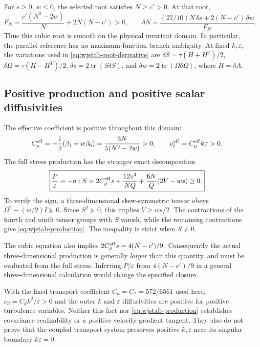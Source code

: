 \documentclass[11pt,a4paper]{article}
\numberwithin{equation}{section}
\begin{document}
For $s\geq0$, $w\leq0$, the selected root satisfies $N\geq c'>0$.
At that root,
\begin{equation}
 F_N=\frac{c'(N^2-2w)}{N}+2N(N-c')>0,
 \qquad
 \delta N=\frac{(27/10)N\,\delta s+2(N-c')\,\delta w}{F_N}.
 \label{eq:wjstab-root-derivative}
\end{equation}
Thus this cubic root is smooth on the physical invariant domain. In
particular, the parallel reference has no maximum-function branch
ambiguity. At fixed $k,\varepsilon$, the variations used in
\eqref{eq:wjstab-root-derivative} are
$\delta S=\tau(H+H^T)/2$, $\delta\Omega=\tau(H-H^T)/2$,
$\delta s=2\operatorname{tr}(S\delta S)$, and
$\delta w=2\operatorname{tr}(\Omega\delta\Omega)$, where $H=\delta A$.

\subsection{Positive production and positive scalar diffusivities}

The effective coefficient is positive throughout this domain:
\begin{equation}
 C_\mu^{\rm eff}=-\frac12(\beta_1+w\beta_6)
       =\frac{3N}{5(N^2-2w)}>0,
 \qquad \nu_t^{\rm eff}=C_\mu^{\rm eff}k\tau>0.
 \label{eq:wjstab-positive-nut}
\end{equation}
The full stress production has the stronger exact decomposition
\begin{equation}
 \boxed{\frac{P}{\varepsilon}=-a:S
 =2C_\mu^{\rm eff}s+\frac{12v^2}{NQ}
             +\frac{6N}{Q}(2V-ws)\geq0.}
 \label{eq:wjstab-production}
\end{equation}
To verify the sign, a three-dimensional skew-symmetric tensor obeys
$\Omega^2-(w/2)I\succeq0$. Since $S^2\succeq0$, this implies
$V\geq ws/2$. The contractions of the fourth and ninth tensor groups
with $S$ vanish, while the remaining contractions give
\eqref{eq:wjstab-production}. The inequality is strict when $S\neq0$.

The cubic equation also implies
$2C_\mu^{\rm eff}s=4(N-c')/9$. Consequently the actual
three-dimensional production is generally \emph{larger} than this
quantity, and must be evaluated from the full stress. Inferring
$P/\varepsilon$ from $4(N-c')/9$ in a general three-dimensional
calculation would change the specified closure.

With the fixed transport coefficient $C_d=C_*=572/6561$ used here,
$\nu_d=C_dk^2/\varepsilon>0$ and the outer $k$ and
$\varepsilon$ diffusivities are positive for positive turbulence
variables. Neither this fact nor \eqref{eq:wjstab-production} establishes
covariance realizability or a positive velocity-gradient tangent. They
also do not prove that the coupled transport system preserves positive
$k,\varepsilon$ near its singular boundary $k\varepsilon=0$.
\end{document}
